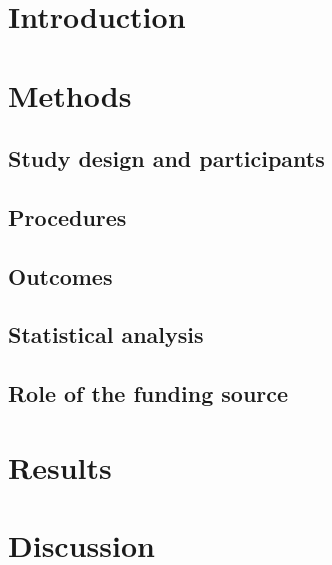 \documentclass[12pt,a4paper]{article}
\begin{document}
\section{Introduction}

\section{Methods}

\subsection{Study design and participants}

\subsection{Procedures}

\subsection{Outcomes}

\subsection{Statistical analysis}

\subsection{Role of the funding source}

\section{Results}

\section{Discussion}
\end{document}
